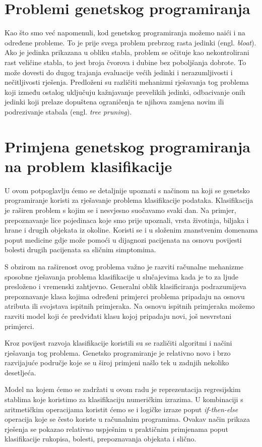 \documentclass[times, utf8, zavrsni]{fer}
\begin{document}
\section{Problemi genetskog programiranja}
Kao što smo već napomenuli, kod genetskog programiranja možemo naići i na određene probleme. To je prije svega problem prebrzog rasta jedinki (engl. \textit {bloat}). Ako je jedinka prikazana u obliku stabla, problem se očituje kao nekontrolirani rast veličine stabla, to jest broja čvorova i dubine bez poboljšanja dobrote. To može dovesti do dugog trajanja evaluacije većih jedinki i nerazumljivosti i nečitljivosti rješenja. Predloženi su različiti mehanizmi rješavanja tog problema koji između ostalog uključuju kažnjavanje prevelikih jedinki, odbacivanje onih jedinki koji prelaze dopuštena ograničenja te njihova zamjena novim ili podrezivanje stabala (engl. \textit{tree pruning}). 

\section{Primjena genetskog programiranja na problem klasifikacije}
U ovom potpoglavlju ćemo se detaljnije upoznati s načinom na koji se genetsko programiranje koristi za rješavanje problema klasifikacije podataka. Klasifikacija je raširen problem s kojim se i nesvjesno suočavamo svaki dan. Na primjer, prepoznavanje lice pojedinaca koje smo prije upoznali, vrsta životinja, biljaka i hrane i drugih objekata iz okoline. Koristi se i u složenim znanstvenim domenama poput medicine gdje može pomoći u dijagnozi pacijenata na osnovu povijesti bolesti drugih pacijenata sa sličnim simptomima. 

S obzirom na raširenost ovog problema važno je razviti računalne mehanizme sposobne rješavanja problema klasifikacije u slučajevima kada je to za ljude presloženo i vremenski zahtjevno. Generalni oblik klasificiranja podrazumijeva prepoznavanje klasa kojima određeni primjerci problema pripadaju na osnovu atributa ili svojstava ispitnih primjeraka. Na osnovu ispitnih primjeraka možemo razviti model koji će predviđati klasu kojoj pripadaju novi, još nesvrstani primjerci.

Kroz povijest razvoja klasifikacije koristili su se različiti algoritmi i načini rješavanja tog problema. Genetsko programiranje je relativno novo i brzo razvijajuće područje koje se u široj primjeni našlo tek u zadnjih nekoliko desetljeća.

Model na kojem ćemo se zadržati u ovom radu je reprezentacija regresijskim stablima koje koristimo za klasifikaciju numeričkim izrazima. U kombinaciji s aritmetičkim operacijama koristit ćemo se i logičke izraze poput \textit{if-then-else} operacija koje se često koriste u računalnim programima. Ovakav način prikaza rješenja se pokazao relativno uspješnim u praktičnim primjenama poput klasifikacije rukopisa, bolesti, prepoznavanja objekata i slično. 
\end{document}
